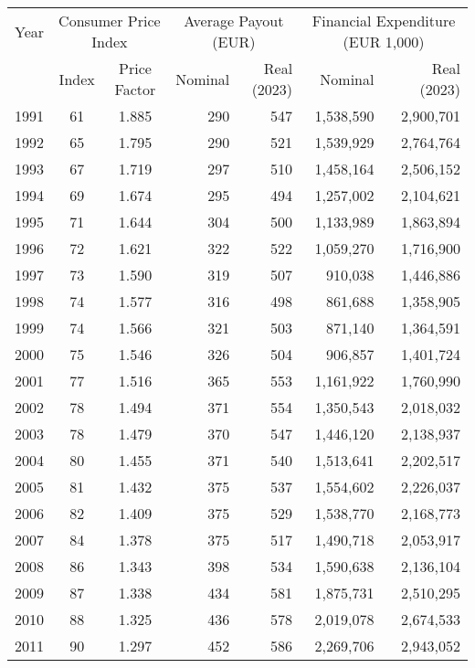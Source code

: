 \begingroup
\renewcommand{\arraystretch}{0.8}
\begin{table}[H]
  \footnotesize
  \centering
  \begin{tabular}{rcc|rr|rr}
  \toprule
  Year & \multicolumn{2}{c|}{Consumer Price Index} & \multicolumn{2}{c|}{Average Payout (EUR)} & \multicolumn{2}{c}{Financial Expenditure (EUR 1,000)} \\
  \cmidrule(lr){2-3} \cmidrule(lr){4-5} \cmidrule(l){6-7}
  & Index & Price Factor  & Nominal & Real (2023) & Nominal & Real (2023) \\
  \midrule
  1991 & 61 & 1.885 & 290 & 547 & 1,538,590 & 2,900,701 \\
  1992 & 65 & 1.795 & 290 & 521 & 1,539,929 & 2,764,764 \\
  1993 & 67 & 1.719 & 297 & 510 & 1,458,164 & 2,506,152 \\
  1994 & 69 & 1.674 & 295 & 494 & 1,257,002 & 2,104,621 \\
  1995 & 71 & 1.644 & 304 & 500 & 1,133,989 & 1,863,894 \\
  1996 & 72 & 1.621 & 322 & 522 & 1,059,270 & 1,716,900 \\
  1997 & 73 & 1.590 & 319 & 507 & 910,038 & 1,446,886 \\
  1998 & 74 & 1.577 & 316 & 498 & 861,688 & 1,358,905 \\
  1999 & 74 & 1.566 & 321 & 503 & 871,140 & 1,364,591 \\
  2000 & 75 & 1.546 & 326 & 504 & 906,857 & 1,401,724 \\
  2001 & 77 & 1.516 & 365 & 553 & 1,161,922 & 1,760,990 \\
  2002 & 78 & 1.494 & 371 & 554 & 1,350,543 & 2,018,032 \\
  2003 & 78 & 1.479 & 370 & 547 & 1,446,120 & 2,138,937 \\
  2004 & 80 & 1.455 & 371 & 540 & 1,513,641 & 2,202,517 \\
  2005 & 81 & 1.432 & 375 & 537 & 1,554,602 & 2,226,037 \\
  2006 & 82 & 1.409 & 375 & 529 & 1,538,770 & 2,168,773 \\
  2007 & 84 & 1.378 & 375 & 517 & 1,490,718 & 2,053,917 \\
  2008 & 86 & 1.343 & 398 & 534 & 1,590,638 & 2,136,104 \\
  2009 & 87 & 1.338 & 434 & 581 & 1,875,731 & 2,510,295 \\
  2010 & 88 & 1.325 & 436 & 578 & 2,019,078 & 2,674,533 \\
  2011 & 90 & 1.297 & 452 & 586 & 2,269,706 & 2,943,052 \\

\end{tabular}
\end{table}
